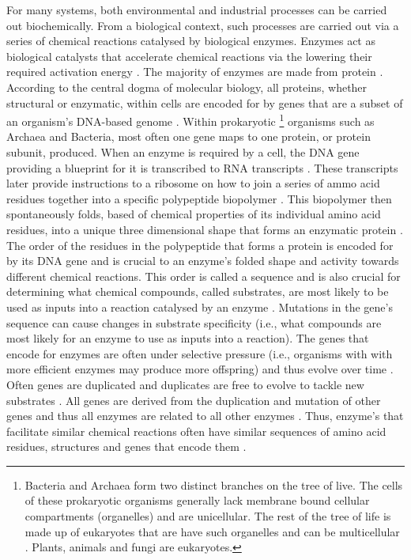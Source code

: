 For many systems, both environmental and industrial processes can be carried out biochemically. From a biological context, such processes are carried out via a series of chemical reactions catalysed by biological enzymes. Enzymes act as biological catalysts that accelerate chemical reactions via the lowering their required activation energy \cite{segel1975enzyme}. The majority of enzymes are made from protein \cite{kruger1982self}. According to the central dogma of molecular biology, all proteins, whether structural or enzymatic, within cells are encoded for by genes that are a subset of an organism's DNA-based genome \cite{crick1970central}. Within prokaryotic \footnote{Bacteria and Archaea form two distinct branches on the tree of live. The cells of these prokaryotic organisms generally \cite{nevo2007thylakoid,cameron2013biogenesis,bazylinski2004magnetosome,van2008combined,adams2000heterocyst,o2000biofilm} lack membrane bound cellular compartments (organelles) and are unicellular. The rest of the tree of life is made up of eukaryotes that are have such organelles and can be multicellular \cite{baldauf2003deep}. Plants, animals and fungi are eukaryotes.} organisms such as Archaea and Bacteria, most often one gene maps to one protein, or protein subunit, produced. When an enzyme is required by a cell, the DNA gene providing a blueprint for it is transcribed to RNA transcripts \cite{crick1970central}. These transcripts later provide instructions to a ribosome on how to join a series of ammo acid residues together into a specific polypeptide biopolymer \cite{crick1970central}. This biopolymer then spontaneously folds, based of chemical properties of its individual amino acid residues, into a unique three dimensional shape that forms an enzymatic protein \cite{fersht1992folding}. The order of the residues in the polypeptide that forms a protein is encoded for by its DNA gene and is crucial to an enzyme's folded shape and activity towards different chemical reactions. This order is called a sequence and is also crucial for determining what chemical compounds, called substrates, are most likely to be used as inputs into a reaction catalysed by an enzyme \cite{fersht1992folding,fersht1999structure}. Mutations in the gene's sequence can cause changes in substrate specificity (i.e., what compounds are most likely for an enzyme to use as inputs into a reaction). The genes that encode for enzymes are often under selective pressure (i.e., organisms with with more efficient enzymes may produce more offspring) and thus evolve over time \cite{zhang2003evolution,whelan2001general}. Often genes are duplicated and duplicates are free to evolve to tackle new substrates \cite{zhang2003evolution}. All genes are derived from the duplication and mutation of other genes and thus all enzymes are related to all other enzymes \cite{zhang2003evolution,whelan2001general}. Thus, enzyme's that facilitate similar chemical reactions often \cite{galperin1998analogous} have similar sequences of amino acid residues, structures and genes that encode them \cite{zhang2003evolution}.

